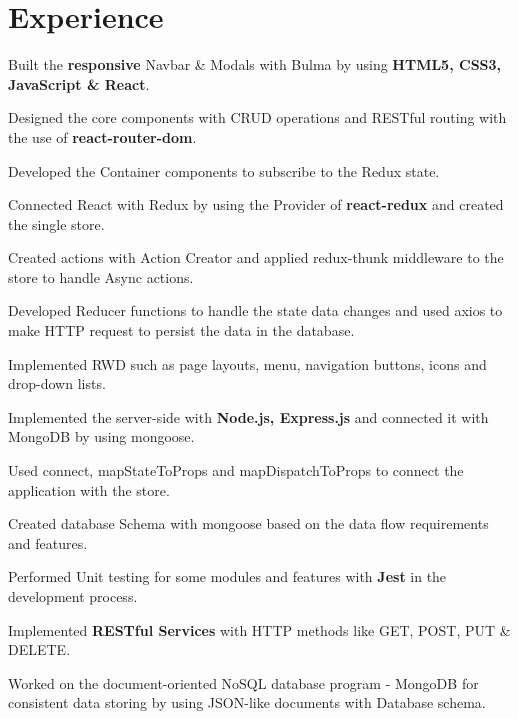 \documentclass[letterpaper]{deedy-resume} %
\begin{document}
\hfill
%
%
\begin{minipage}[t]{0.66\textwidth} %

\section{Experience}

\vspace{\topsep} %
\vspace{\topsep}
\begin{tightitemize}
	\item Built the \textbf{responsive} Navbar \& Modals with Bulma by using \textbf{HTML5, CSS3, JavaScript \& React}.
	\item Designed the core components with CRUD operations and RESTful routing with the use of \textbf{react-router-dom}.
	\item Developed the Container components to subscribe to the Redux state.
	\item Connected React with Redux by using the Provider of \textbf{react-redux} and created the single store.
	\item Created actions with Action Creator and applied redux-thunk middleware to the store to handle Async actions.
	\item Developed Reducer functions to handle the state data changes and used axios to make HTTP request to persist the data in the database.
	\item Implemented RWD such as page layouts, menu, navigation buttons, icons and drop-down lists.
	\item Implemented the server-side with \textbf{Node.js, Express.js} and connected it with MongoDB by using mongoose.
	\item Used connect, mapStateToProps and mapDispatchToProps to connect the application with the store.
	\item Created database Schema with mongoose based on the data flow requirements and features.
	\item Performed Unit testing for some modules and features with \textbf{Jest} in the development process.
	\item Implemented \textbf{RESTful Services} with HTTP methods like GET, POST, PUT \& DELETE.
	\item Worked on the document-oriented NoSQL database program - MongoDB for consistent data storing by using JSON-like documents with Database schema.
	

\end{tightitemize}
\end{minipage}
\end{document}
